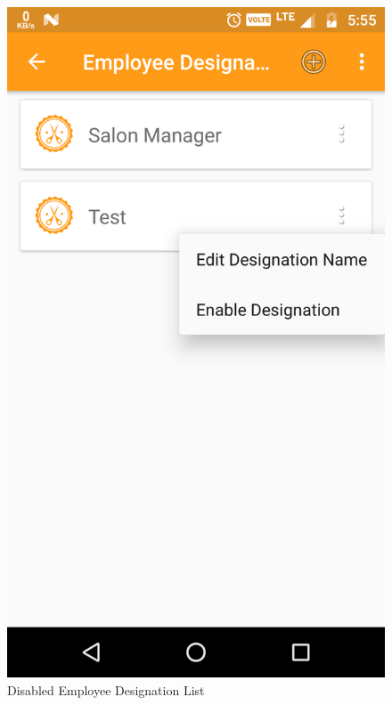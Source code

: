 \\
\begin{figure}[h]
	\centering
	\includegraphics[width=0.7\linewidth]{DisabledEmployeeDesignationList}
	\caption{Disabled Employee Designation List}
\end{figure}
\pagebreak

